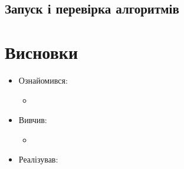 \subsection{Запуск і перевірка алгоритмів}

\section{Висновки}
\begin{itemize}
	\item Ознайомився:
		\begin{itemize}
			\item
		\end{itemize}
	\item Вивчив:
		\begin{itemize}
			\item
		\end{itemize}
	\item Реалізував:
		\begin{itemize}
			\iteg
		\end{itemize}
\end{itemize}